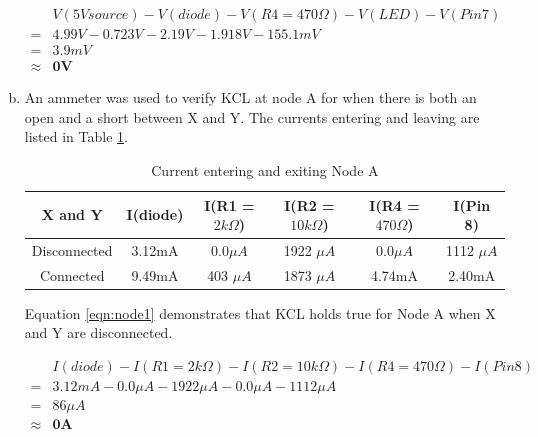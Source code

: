 \documentclass[12pt]{article}
\begin{document}
\begin{enumerate}[a)]
        \begin{equation}
            \label{eqn:loop2}
            \begin{split}
            & V(5V source) - V(diode) - V(R4 = 470\Omega) - V(LED) - V(Pin 7) \\
            = & 4.99V - 0.723V - 2.19V - 1.918V - 155.1mV \\
            = & 3.9mV \\
            \approx & \textbf{0V}
            \end{split}
        \end{equation}
    \item An ammeter was used to verify KCL at node A for when there is both an open and 
        a short between X and Y. The currents entering and leaving are listed in Table 
        \ref{tbl:nodea}.
        \begin{table}[ht]
            \centering
            \caption{Current entering and exiting Node A}
            \label{tbl:nodea}
            \begin{tabular}{| c | c | c | c | c | c |}
                \hline
                X and Y & I(diode) & I(R1 = $2k\Omega$) & I(R2 = $10k\Omega$) & I(R4 = $470\Omega$) & I(Pin 8) \\
                \hline
                Disconnected & 3.12mA & 0.0$\mu A$ & 1922 $\mu A$ & 0.0$\mu A$ & 1112 $\mu A$ \\
                \hline
                Connected & 9.49mA & 403 $\mu A$ & 1873 $\mu A$ & 4.74mA & 2.40mA \\
                \hline  
            \end{tabular}
        \end{table}

        Equation \ref{eqn:node1} demonstrates that KCL holds true for Node A when X and Y are disconnected.

        \begin{equation}
            \label{eqn:node1}
            \begin{split}
                & I(diode) - I(R1 = 2k\Omega) - I(R2 = 10k\Omega) - I(R4 = 470\Omega) - I(Pin 8) \\
                = & 3.12mA - 0.0\mu A - 1922 \mu A - 0.0\mu A - 1112 \mu A \\
                = & 86\mu A \\
                \approx & \textbf{0A}
            \end{split}
        \end{equation}


\end{enumerate}
\end{document}
